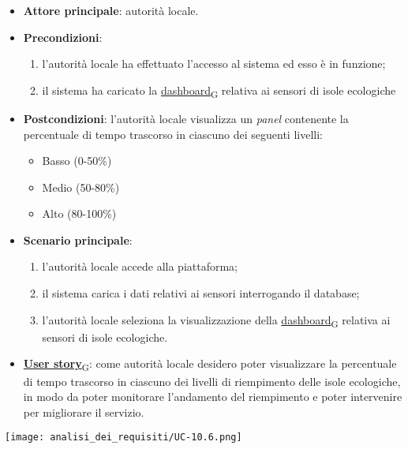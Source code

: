 \begin{itemize}
	\item \textbf{Attore principale}: autorità locale.
	\item \textbf{Precondizioni}:
	      \begin{enumerate}
		      \item l'autorità locale ha effettuato l'accesso al sistema ed esso è in funzione;
		      \item il sistema ha caricato la \href{https://7last.github.io/docs/rtb/documentazione-interna/glossario\#dashboard}{dashboard\textsubscript{G}} relativa ai sensori di isole ecologiche
	      \end{enumerate}
	\item \textbf{Postcondizioni}: l'autorità locale visualizza un \textit{panel} contenente la percentuale di tempo trascorso in ciascuno dei seguenti livelli:
	      \begin{itemize}
		      \item Basso (0-50\%)
		      \item Medio (50-80\%)
		      \item Alto (80-100\%)
	      \end{itemize}
\newpage
	\item \textbf{Scenario principale}:
	      \begin{enumerate}
		      \item l'autorità locale accede alla piattaforma;
		      \item il sistema carica i dati relativi ai sensori interrogando il database;
		      \item l'autorità locale seleziona la visualizzazione della \href{https://7last.github.io/docs/rtb/documentazione-interna/glossario\#dashboard}{dashboard\textsubscript{G}} relativa ai sensori di isole ecologiche.
	      \end{enumerate}
	\item \href{https://7last.github.io/docs/rtb/documentazione-interna/glossario\#user-story}{\textbf{User story}\textsubscript{G}}:
	      come autorità locale desidero poter visualizzare la percentuale di tempo trascorso in ciascuno dei livelli di riempimento delle isole ecologiche,
	      in modo da poter monitorare l'andamento del riempimento e poter intervenire per migliorare il servizio.
\end{itemize}
\begin{center}
	\texttt{[image: analisi\_dei\_requisiti/UC-10.6.png]}
\end{center}

